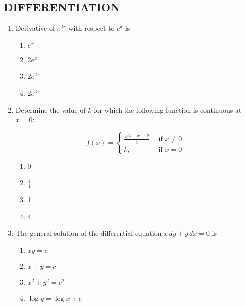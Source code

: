 \documentclass{article}
\begin{document}
\subsection*{DIFFERENTIATION}
\begin{enumerate}[label=\textbf{\arabic*.}] %

    \item Derivative of \( e^{2x} \) with respect to \( e^{x} \) is

    \begin{enumerate}[label=\alph*)] %
        \item \( e^{x} \)
        \item 2\( e^{x} \)
        \item 2\( e^{2x} \)
        \item 2\( e^{3x} \)
    \end{enumerate}

    \item Determine the value of \( k \) for which the following function is continuous at \( x = 0 \):

    \[
    f(x) = 
    \begin{cases}
    \frac{\sqrt{4 + x} - 2}{x}, & \text{if } x \neq 0 \\
    k, & \text{if } x = 0
    \end{cases}
    \]

    \begin{enumerate}[label=\alph*)] %
        \item 0
        \item \(\frac{1}{4}\)
        \item 1
        \item 4
    \end{enumerate}

    \item The general solution of the differential equation \( x \, dy + y \, dx = 0 \) is

    \begin{enumerate}[label=\alph*)] %
        \item \( xy = c \)
        \item \( x + y = c \)
        \item \( x^2 + y^2 = e^2 \)
        \item \( \log y = \log x + c \)
    \end{enumerate}


\end{enumerate}
\end{document}
